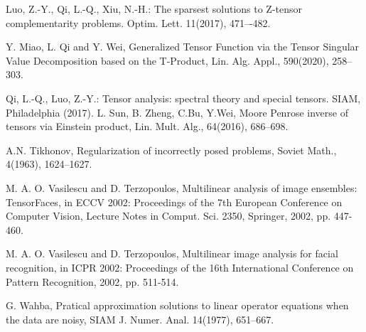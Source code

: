 \documentclass{siamltex}
\newcommand{\1}{\mathbb{1}}
\newcommand{\0}{\mathbb{0}}
\begin{document}
\begin{thebibliography}{99}
		Luo, Z.-Y., Qi, L.-Q., Xiu, N.-H.: The sparsest solutions to Z-tensor complementarity problems. Optim. Lett. 11(2017), 471–-482.
		
		Y. Miao, L. Qi and Y. Wei, Generalized Tensor Function via the Tensor Singular Value Decomposition based on the T-Product, Lin. Alg. Appl., 590(2020), 258--303.
		
		Qi, L.-Q., Luo, Z.-Y.: Tensor analysis: spectral theory and special tensors. SIAM, Philadelphia (2017).
		L. Sun, B. Zheng, C.Bu, Y.Wei, Moore Penrose inverse of tensors via Einstein product, Lin. Mult.  Alg., 64(2016), 686--698.
		
		{ A.N. Tikhonov}, {Regularization of incorrectly posed
			problems}, Soviet Math.,	4(1963), 1624--1627.
		
		M. A. O. Vasilescu and D. Terzopoulos, Multilinear analysis of image ensembles: TensorFaces, in ECCV 2002: Proceedings of the 7th European Conference on Computer Vision, Lecture Notes in Comput. Sci. 2350, Springer, 2002, pp. 447-460.
		
		M. A. O. Vasilescu and D. Terzopoulos, Multilinear image analysis for facial recognition, in ICPR 2002: Proceedings of the 16th International Conference on Pattern Recognition, 2002, pp. 511-514. 
		
		{ G. Wahba},  { Pratical approximation solutions to linear
			operator equations when the data are noisy}, SIAM J. Numer. Anal.
		14(1977), 651--667.
		
		
	\end{thebibliography}
	
\end{document}
